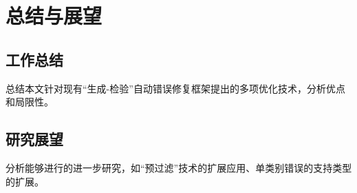 \chapter{总结与展望}
\label{cha:sum}

\section{工作总结}%
总结本文针对现有“生成-检验”自动错误修复框架提出的多项优化技术，分析优点和局限性。
\section{研究展望}%
分析能够进行的进一步研究，如“预过滤”技术的扩展应用、单类别错误的支持类型的扩展。